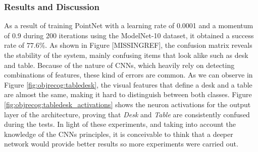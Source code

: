 \subsubsection{Results and Discussion}
\label{cha:objrecog:sec:pointnet:subsec:discussion}

As a result of training PointNet with a learning rate of 0.0001 and a momentum of 0.9 during 200 iterations using the ModelNet-10 dataset, it obtained a success rate of $77.6$\%. As shown in Figure [MISSINGREF], the confusion matrix reveals the stability of the system, mainly confusing items that look alike such as desk and table. Because of the nature of \acp{CNN}, which heavily rely on detecting combinations of features, these kind of errors are common. As we can observe in Figure \ref{fig:objrecog:tabledesk}, the visual features that define a desk and a table are almost the same, making it hard to distinguish between both classes. Figure \ref{fig:objrecog:tabledesk_activations} shows the neuron activations for the output layer of the architecture, proving that \emph{Desk} and \emph{Table} are consistently confused during the tests. In light of these experiments, and taking into account the knowledge of the \acp{CNN} principles, it is conceivable to think that a deeper network would provide better results so more experiments were carried out.


